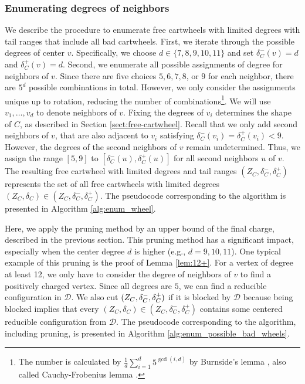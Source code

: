 \documentclass[10pt,a4paper]{article}
\begin{document}
\subsubsection{Enumerating degrees of neighbors}
\label{subsub:enum-degree-neighbor}
We describe the procedure to enumerate free cartwheels with limited degrees with tail ranges that include all bad cartwheels.
First, we iterate through the possible degrees of center $v$.
Specifically, we choose $d \in \{7,8,9,10,11\}$ and set $\delta_C^-(v)=d$ and $\delta_C^+(v)=d$.
Second, we enumerate all possible assignments of degree for neighbors of $v$.
Since there are five choices $5,6,7,8$, or $9$ for each neighbor, there are $5^{d}$ possible combinations in total.
However, we only consider the assignments unique up to rotation, reducing the number of combinations\footnote{The number is calculated by $\frac{1}{d}\sum_{i=1}^d 5^{\gcd(i,d)}$ by Burnside's lemma \cite{burnside1909theory}, also called Cauchy-Frobenius lemma \cite{frobenius}.}.
We will use $v_1, \ldots, v_{d}$ to denote neighbors of $v$.
Fixing the degrees of $v_i$ determines the shape of $C$, as described in Section \ref{sect:free-cartwheel}.
Recall that we only add second neighbors of $v$, that are also adjacent to $v_i$ satisfying $\delta_C^-(v_i)=\delta_C^+(v_i) < 9$.
However, the degrees of the second neighbors of $v$ remain undetermined.
Thus, we assign the range $[5, 9]$ to $[\delta_C^-(u),\delta_C^+(u)]$ for all second neighbors $u$ of $v$.
The resulting free cartwheel with limited degrees and tail ranges $(Z_C, \delta_C^-, \delta_C^+)$ represents the set of all free cartwheels with limited degrees $(Z_C, \delta_C) \in (Z_C, \delta_C^-, \delta_C^+)$.
The pseudocode corresponding to the algorithm is presented in Algorithm \ref{alg:enum_wheel}.

Here, we apply the pruning method by an upper bound of the final charge, described in the previous section.
This pruning method has a significant impact, especially when the center degree $d$ is higher (e.g., $d=9,10,11$).
One typical example of this pruning is the proof of Lemma \ref{lem:12+}.
For a vertex of degree at least 12, we only have to consider the degree of neighbors of $v$
to find a positively charged vertex.
Since all degrees are $5$, we can find a reducible configuration in $\mathcal{D}$.
We also cut $(Z_C, \delta_C^-, \delta_C^+)$ if it is blocked by $\mathcal{D}$ because being blocked implies that every $(Z_C, \delta_C) \in (Z_C, \delta_C^-, \delta_C^+)$ contains some centered reducible configuration from $\mathcal{D}$.
The pseudocode corresponding to the algorithm, including pruning, is presented in Algorithm \ref{alg:enum_possible_bad_wheels}.
\end{document}
